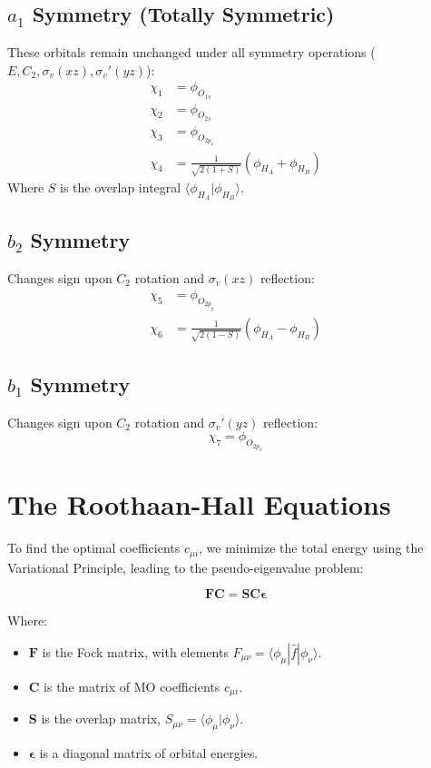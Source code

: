 \documentclass[12pt]{article}
\begin{document}
\subsection{$a_1$ Symmetry (Totally Symmetric)}
These orbitals remain unchanged under all symmetry operations ($E, C_2, \sigma_v(xz), \sigma_v'(yz)$):
\begin{align}
\chi_1 &= \phi_{O_{1s}} \\
\chi_2 &= \phi_{O_{2s}} \\
\chi_3 &= \phi_{O_{2p_z}} \\
\chi_4 &= \frac{1}{\sqrt{2(1+S)}} (\phi_{H_A} + \phi_{H_B})
\end{align}
Where $S$ is the overlap integral $\langle \phi_{H_A} | \phi_{H_B} \rangle$.

\subsection{$b_2$ Symmetry}
Changes sign upon $C_2$ rotation and $\sigma_v(xz)$ reflection:
\begin{align}
\chi_5 &= \phi_{O_{2p_y}} \\
\chi_6 &= \frac{1}{\sqrt{2(1-S)}} (\phi_{H_A} - \phi_{H_B})
\end{align}

\subsection{$b_1$ Symmetry}
Changes sign upon $C_2$ rotation and $\sigma_v'(yz)$ reflection:
\begin{equation}
\chi_7 = \phi_{O_{2p_x}}
\end{equation}

\section{The Roothaan-Hall Equations}
To find the optimal coefficients $c_{\mu i}$, we minimize the total energy using the Variational Principle, leading to the pseudo-eigenvalue problem:

\begin{equation}
\mathbf{F} \mathbf{C} = \mathbf{S} \mathbf{C} \mathbf{\epsilon}
\end{equation}

Where:
\begin{itemize}
    \item $\mathbf{F}$ is the Fock matrix, with elements $F_{\mu\nu} = \langle \phi_\mu | \hat{f} | \phi_\nu \rangle$.
    \item $\mathbf{C}$ is the matrix of MO coefficients $c_{\mu i}$.
    \item $\mathbf{S}$ is the overlap matrix, $S_{\mu\nu} = \langle \phi_\mu | \phi_\nu \rangle$.
    \item $\mathbf{\epsilon}$ is a diagonal matrix of orbital energies.
\end{itemize}
\end{document}
